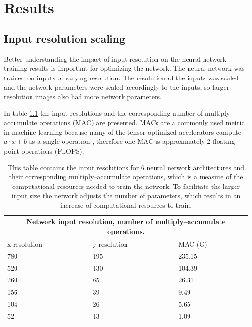 %
\chapter{Results}
\label{sec:results}

\section{Input resolution scaling}

Better understanding the impact of input resolution on the neural network training results is important for optimizing the network. The neural network was trained on inputs of varying resolution. The resolution of the inputs was scaled and the network parameters were scaled accordingly to the inputs, so larger resolution images also had more network parameters.

In table \ref{table:input} the input resolutions and the corresponding number of multiply–accumulate operations (MAC) are presented. MACs are a commonly used metric in machine learning because many of the tensor optimized accelerators compute $a \cdot x+b$ as a single operation \cite{nvidia_technical_blog_2022}, therefore one MAC is approximately 2 floating point operations (FLOPS).

\begin{table}
    \begin{tabular}{ |p{3cm}|p{3cm}|p{4cm}|  }
        \hline
        \multicolumn{3}{|c|}{Network input resolution, number of multiply–accumulate operations.} \\
        \hline
        x resolution & y resolution & MAC (G)                                                     \\
        \hline
        780          & 195          & 235.15                                                      \\
        520          & 130          & 104.39                                                      \\
        260          & 65           & 26.31                                                       \\
        156          & 39           & 9.49                                                        \\
        104          & 26           & 5.65                                                        \\
        52           & 13           & 1.09                                                        \\
        \hline
    \end{tabular}
    \caption{This table contains the input resolutions for 6 neural network architectures and their corresponding multiply–accumulate operations, which is a measure of the computational resources needed to train the network. To facilitate the larger input size the network adjusts the number of parameters, which results in an increase of computational resources to train.}
    \label{table:input}
\end{table}

